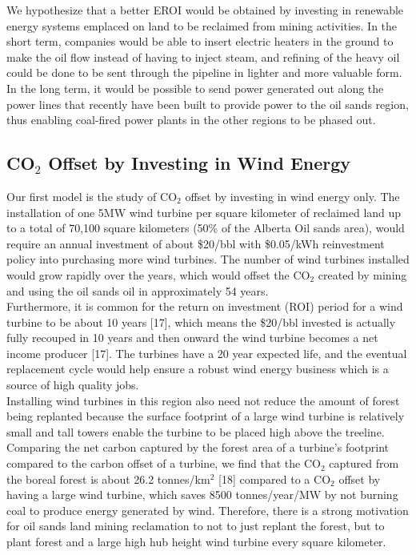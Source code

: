 \documentclass[11pt]{article}
\begin{document}
We hypothesize that a better EROI would be obtained by investing in renewable energy systems emplaced on land to be reclaimed from mining activities. In the short term, companies would be able to insert electric heaters in the ground to make the oil flow instead of having to inject steam, and refining of the heavy oil could be done to be sent through the pipeline in lighter  and more valuable form. In the long term, it would be possible to send power generated out along the power lines that recently have been built to provide power to the oil sands region, thus enabling coal-fired power plants in the other regions to be phased out.

\subsection{CO$_2$ Offset by Investing in Wind Energy}

Our first model is the study of CO$_2$ offset by investing in wind energy only. The installation of one 5MW wind turbine per square kilometer of reclaimed land up to a total of 70,100 square kilometers (50\% of the Alberta Oil sands area), would require an annual investment of about \$20/bbl with \$0.05/kWh reinvestment policy into purchasing more wind turbines.  The number of wind turbines installed would grow rapidly over the years, which would offset the CO$_2$ created by mining and using the oil sands oil in approximately 54 years. \\
 
Furthermore, it is common for the return on investment (ROI) period for a wind turbine to be about 10 years [17], which means the \$20/bbl invested is actually fully recouped in 10 years and then onward the wind turbine becomes a net income producer [17].  The turbines have a 20 year expected life, and the eventual replacement cycle would help ensure a robust wind energy business which is a source of high quality jobs. \\

Installing wind turbines in this region also need not reduce the amount of forest being replanted because the surface footprint of a large wind turbine is relatively small and tall towers enable the turbine to be placed high above the treeline. Comparing the net carbon captured by the forest area of a turbine’s footprint compared to the carbon offset of a turbine, we find that the CO$_2$ captured from the boreal forest is about 26.2 tonnes/km$^2$ [18] compared to a CO$_2$ offset by having a large wind turbine, which saves 8500 tonnes/year/MW by not burning coal to produce energy generated by wind. Therefore, there is a strong motivation for oil sands land mining reclamation to not to just replant the forest, but to plant forest and a large high hub height wind turbine every square kilometer. \\
  
\end{document}

